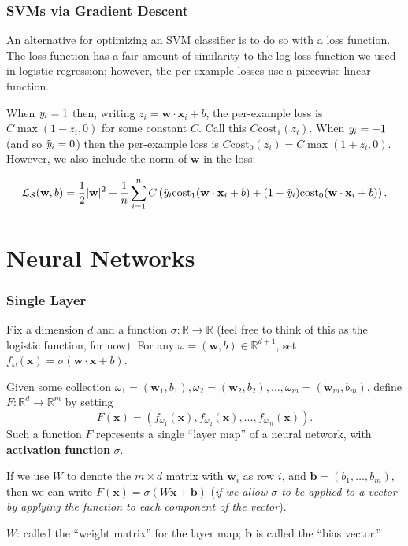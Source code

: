 \documentclass[smaller]{beamer}
\theoremstyle{example}
\newcommand{\x}{\textbf{x}}
\newcommand{\ix}[1]{{\it #1}}
\begin{document}
\begin{frame}
    \frametitle{SVMs via Gradient Descent}
    An alternative for optimizing an SVM classifier is to do so with a loss function. The loss function has a fair amount of similarity to the log-loss function we used in logistic regression; however, the per-example losses use a piecewise linear function.

    When $\ix y_i = 1$ then, writing $z_i = \textbf{w}\cdot\x_i + b$, the per-example loss is $C\max(1-z_i, 0)$ for some constant $C$. Call this $C\text{cost}_1(z_i)$. When $\ix y_i=-1$ (and so $\tilde{\ix y}_i = 0$) then the per-example loss is $C\text{cost}_0(z_i) = C\max(1+z_i, 0)$. However, we also include the norm of $\textbf{w}$ in the loss: 

    \[\mathcal L_{\mathcal S}(\textbf{w}, b) = \frac12|\textbf{w}|^2 + \frac{1}{n}\sum_{i=1}^nC\left(\tilde{\ix y}_i\text{cost}_1(\textbf{w}\cdot\x_i + b) + (1 - \tilde{\ix y}_i)\text{cost}_0(\textbf{w}\cdot\x_i + b)\right).\]
\end{frame}

\section{Neural Networks}

\begin{frame}
    \frametitle{Single Layer}
    Fix a dimension $d$ and a function $\sigma:\mathbb R\to\mathbb R$ (feel free to think of this as the logistic function, for now). For any $\omega = (\textbf{w}, b) \in \mathbb R^{d+1}$, set $f_{\omega}(\x) = \sigma(\textbf{w}\cdot\x + b)$.
    \pause

    Given some collection $\omega_1=(\textbf{w}_1,b_1), \omega_2=(\textbf{w}_2,b_2), \ldots, \omega_{m}=(\textbf{w}_m,b_m)$, define $F:\mathbb R^d \to \mathbb R^m$ by setting 
            \[F(\x) = (f_{\omega_1}(\x), f_{\omega_2}(\x), \ldots, f_{\omega_m}(\x)).\]
    Such a function $F$ represents a single ``layer map'' of a neural network, with {\bf activation function} $\sigma$. 
    \pause 

    If we use $W$ to denote the $m\times d$ matrix with $\textbf{w}_i$ as row $i$, and $\textbf{b} = (b_1,\ldots,b_m)$, then we can write $F(\x) = \sigma(W\x + \textbf{b})$ (\textit{if we allow $\sigma$ to be applied to a vector by applying the function to each component of the vector}).

    $W$: called the ``weight matrix'' for the layer map; $\textbf{b}$ is called the ``bias vector.''
\end{frame}
\end{document}
